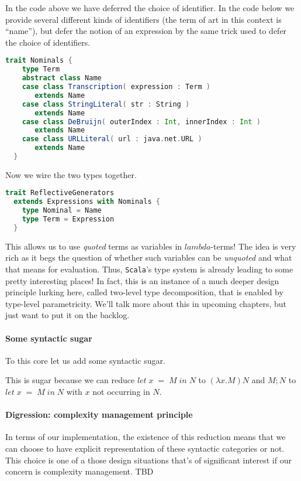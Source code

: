 In the code above we have deferred the choice of identifier. In the
code below we provide several different kinds of identifiers (the term
of art in this context is ``name''), but defer the notion of an
expression by the same trick used to defer the choice of identifiers.

\begin{lstlisting}[language=Scala]
  trait Nominals {
    type Term
    abstract class Name
    case class Transcription( expression : Term )
       extends Name
    case class StringLiteral( str : String )
       extends Name
    case class DeBruijn( outerIndex : Int, innerIndex : Int )
       extends Name
    case class URLLiteral( url : java.net.URL )
       extends Name
  }
\end{lstlisting}

Now we wire the two types together.

\begin{lstlisting}[language=Scala]
  trait ReflectiveGenerators
  extends Expressions with Nominals {
    type Nominal = Name
    type Term = Expression
  }
\end{lstlisting}

This allows us to use \emph{quoted} terms as variables in
$lambda$-terms! The idea is very rich as it begs the question of
whether such variables can be \emph{unquoted} and what that means for
evaluation. Thus, \texttt{Scala}'s type system is already leading
to some pretty interesting places! In fact, this is an instance of a
much deeper design principle lurking here, called two-level type
decomposition, that is enabled by type-level parametricity. We'll talk
more about this in upcoming chapters, but just want to put it on the
backlog.

\paragraph{Some syntactic sugar}
To this core let us add some syntactic sugar.


This is sugar because we can reduce $let \; x \; = \; M \; in \; N$ to
$(\lambda x. M) N$ and $ M; N$ to $let \; x \; = \; M \; in \; N$ with
$x$ not occurring in $N$.

\paragraph{Digression: complexity management principle} In terms of
our implementation, the existence of this reduction means that we can
choose to have explicit representation of these syntactic categories
or not. This choice is one of a those design situations that's of
significant interest if our concern is complexity management. TBD

